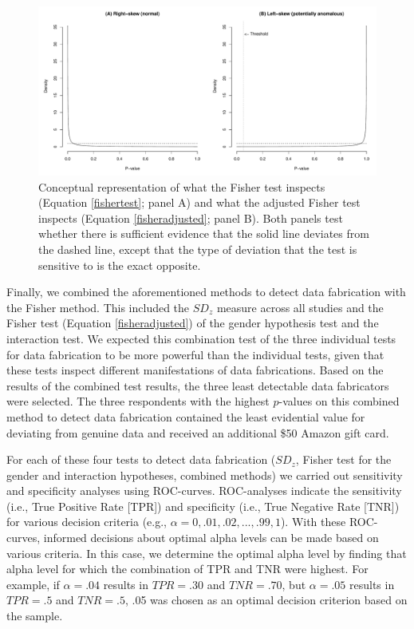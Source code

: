 \documentclass{article}
\begin{document}
\begin{figure}[!ht]
\begin{center}
\includegraphics[width=\textwidth,height=\textheight,keepaspectratio]{../figures/fisherfig.pdf}
\caption{Conceptual representation of what the Fisher test inspects (Equation \ref{fishertest}; panel A) and what the adjusted Fisher test inspects (Equation \ref{fisheradjusted}; panel B). Both panels test whether there is sufficient evidence that the solid line deviates from the dashed line, except that the type of deviation that the test is sensitive to is the exact opposite.}
\label{leftskew}
\end{center}
\end{figure}

Finally, we combined the aforementioned methods to detect data fabrication with the Fisher method. This included the $SD_z$ measure across all studies and the Fisher test (Equation \ref{fisheradjusted}) of the gender hypothesis test and the interaction test.  We expected this combination test of the three individual tests for data fabrication to be more powerful than the individual tests, given that these tests inspect different manifestations of data fabrications. Based on the results of the combined test results, the three least detectable data fabricators were selected. The three respondents with the highest $p$-values on this combined method to detect data fabrication contained the least evidential value for deviating from genuine data and received an additional \$50 Amazon gift card.

For each of these four tests to detect data fabrication ($SD_z$, Fisher test for the gender and interaction hypotheses, combined methods) we carried out sensitivity and specificity analyses using ROC-curves. ROC-analyses indicate the sensitivity (i.e., True Positive Rate [TPR]) and specificity (i.e., True Negative Rate [TNR]) for various decision criteria (e.g., $\alpha=0, .01, .02, ..., .99, 1$). With these ROC-curves, informed decisions about optimal alpha levels can be made based on various criteria. In this case, we determine the optimal alpha level by finding that alpha level for which the combination of TPR and TNR were highest. For example, if $\alpha=.04$ results in $TPR=.30$ and $TNR=.70$, but $\alpha=.05$ results in $TPR=.5$ and $TNR=.5$, .05 was chosen as an optimal decision criterion based on the sample. 
\end{document}
